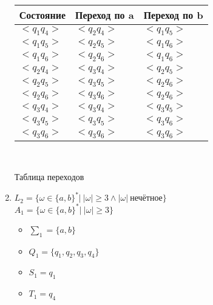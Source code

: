 \documentclass{article}
\begin{document}
\begin{enumerate}
            \begin{tabular}{ | l | l | l | }
                \hline
                Состояние & Переход по a & Переход по b \\ \hline
                $<q_1q_4>$ & $<q_2q_4>$ & $<q_1q_5>$  \\ \hline
                $<q_1q_5>$ & $<q_2q_5>$ & $<q_1q_6>$ \\ \hline
                $<q_1q_6>$ & $<q_2q_6>$ & $<q_1q_6>$ \\ \hline
                $<q_2q_4>$ & $<q_3q_4>$ & $<q_2q_5>$ \\ \hline
                $<q_2q_5>$ & $<q_3q_5>$ & $<q_2q_6>$ \\ \hline
                $<q_2q_6>$ & $<q_3q_6>$ & $<q_2q_6>$ \\ \hline 
                $<q_3q_4>$ & $<q_3q_4>$ & $<q_3q_5>$ \\ \hline
                $<q_3q_5>$ & $<q_3q_5>$ & $<q_3q_6>$ \\ \hline
                $<q_3q_6>$ & $<q_3q_6>$ & $<q_3q_6>$ \\
                \hline
            \end{tabular} \\
        
            \begin{center}
                Таблица переходов
            \end{center}
        
        
        \item $ L_2 = \{ \omega \in \{a,b\}^*| \ |\omega| \geq 3 \land |\omega| \  \text{нечётное} \}$ \\
        
            $A_1 = \{ \omega \in \{a,b\}^*| \ |\omega| \geq 3 \}$

            \begin{center}
            \end{center}
            
            \begin{itemize}
                \item $\sum_1 = \{ a,b \}$ \\
                \item $Q_1 = \{ q_1, q_2, q_3, q_4 \} $ \\
                \item $S_1 = q_1$ \\
                \item $T_1 = q_4$ \\
            \end{itemize}
            

\end{enumerate}
\end{document}
